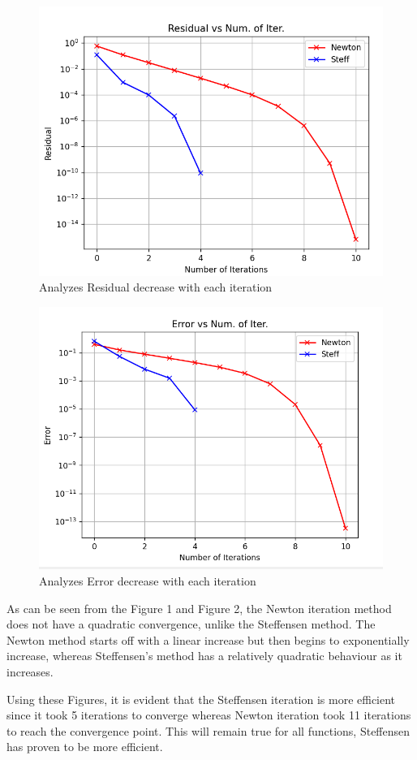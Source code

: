 \documentclass{article}
\begin{document}
    \begin{figure}[!htb]
        \centering
        \includegraphics[width=0.5\linewidth]{res_plot.png}
        \caption{Analyzes Residual decrease with each iteration}
        \label{fig:1}
    \end{figure}

    \begin{figure}[!htb]
        \centering
        \includegraphics[width=0.5\linewidth]{err_plot.png}
        \caption{Analyzes Error decrease with each iteration}
        \label{fig:2}
    \end{figure}

        As can be seen from the Figure 1 and Figure 2, the Newton iteration method does not have a quadratic convergence, unlike the Steffensen method.  The Newton method starts off with a linear increase but then begins to exponentially increase, whereas Steffensen's method has a relatively quadratic behaviour as it increases.

        Using these Figures, it is evident that the Steffensen iteration is more efficient since it took 5 iterations to converge whereas Newton iteration took 11 iterations to reach the convergence point.  This will remain true for all functions, Steffensen has proven to be more efficient.
        
\end{document}
